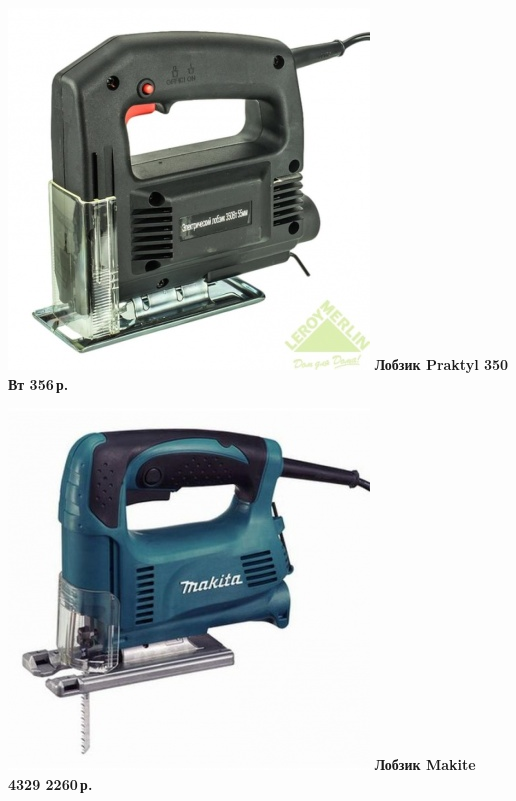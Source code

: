 \documentclass{magazine}
\begin{document}
{\noindent\href{http://leroymerlin.ru/catalogue/instrumenty/elektroinstrument/lobziki/13805991/}{
\includegraphics[width=\columnwidth]{fig/00/LobzPraktyl.jpg}}
\textbf{Лобзик Praktyl 350 Вт 356\,р.}

\noindent\href{http://leroymerlin.ru/catalogue/instrumenty/elektroinstrument/lobziki/12114283/}{
\includegraphics[width=\columnwidth]{fig/00/LobzMakita4329.jpg}}
\textbf{Лобзик Makite 4329 2260\,р.}

}
\end{document}
